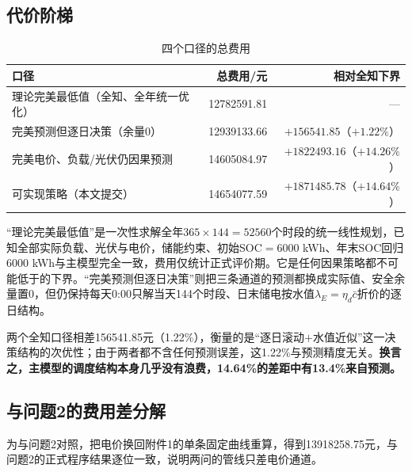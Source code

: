 \documentclass[UTF8,12pt]{ctexart}
\begin{document}
\subsection{代价阶梯}
\begin{table}[H]\centering
\caption{四个口径的总费用}
\begin{tabular}{lrr}\toprule
口径 & 总费用/元 & 相对全知下界\\\midrule
理论完美最低值（全知、全年统一优化） & 12782591.81 & ---\\
完美预测但逐日决策（余量0） & 12939133.66 & $+156541.85$（$+1.22\%$）\\
完美电价、负载/光伏仍因果预测 & 14605084.97 & $+1822493.16$（$+14.26\%$）\\
可实现策略（本文提交） & 14654077.59 & $+1871485.78$（$+14.64\%$）\\\bottomrule
\end{tabular}
\end{table}

“理论完美最低值”是一次性求解全年$365\times144=52560$个时段的统一线性规划，已知全部实际负载、光伏与电价，储能约束、初始SOC$=6000$ kWh、年末SOC回归6000 kWh与主模型完全一致，费用仅统计正式评价期。它是任何因果策略都不可能低于的下界。“完美预测但逐日决策”则把三条通道的预测都换成实际值、安全余量置0，但仍保持每天0:00只解当天144个时段、日末储电按水值$\lambda_E=\eta_d\bar c$折价的逐日结构。

两个全知口径相差156541.85元（1.22\%），衡量的是“逐日滚动$+$水值近似”这一决策结构的次优性；由于两者都不含任何预测误差，这1.22\%与预测精度无关。\textbf{换言之，主模型的调度结构本身几乎没有浪费，14.64\%的差距中有13.4\%来自预测。}

\subsection{与问题2的费用差分解}
为与问题2对照，把电价换回附件1的单条固定曲线重算，得到13918258.75元，与问题2的正式程序结果逐位一致，说明两问的管线只差电价通道。

\begin{table}[H]\centering\small
\caption{问题2与问题4的三层口径对照}
\end{table}
\end{document}
